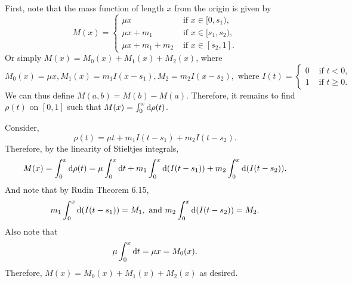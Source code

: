 \documentclass[12pt]{article}
\begin{document}
\begin{fproof}[3]
  First, note that the mass function of length \(x\) from the origin is given by
\[
    M(x) = \begin{cases}
        \mu x & \text{ if } x \in [0, s_1),\\
        \mu x + m_1 & \text{ if } x \in [s_1, s_2),\\
        \mu x + m_1 + m_2 & \text{ if } x \in [s_2, 1].
    \end{cases}
\]
Or simply \(M(x) = M_0(x) + M_1(x) + M_2(x)\), where
\[
    M_0(x) = \mu x, M_1(x) = m_1I(x-s_1), M_2 = m_2I(x-s_2), \text{ where } I(t) = 
    \begin{cases}
        0 & \text{ if } t < 0,\\
        1 & \text{ if } t \geq 0.
    \end{cases}
\]
  We can thus define \(M(a,b) = M(b) - M(a)\).
  Therefore, it remains to find \(\rho(t)\) on \([0,1]\) such that \(M(x) = \int_{0}^{x} \mathop{}\!\mathrm{d}\rho(t)\).

  Consider,
  \[
    \rho(t) = \mu t + m_1I(t-s_1) + m_2I(t-s_2).
  \]
  Therefore, by the linearity of Stieltjes integrals,
  \begin{align*}
    M(x) = \int_{0}^{x} \mathop{}\!\mathrm{d}\rho(t) = \mu \int_{0}^{x} \mathop{}\!\mathrm{d} t + m_1 \int_{0}^{x} \mathop{}\!\mathrm{d}(I(t-s_1)) + m_2 \int_{0}^{x} \mathop{}\!\mathrm{d}(I(t-s_2)).
  \end{align*}
  And note that by Rudin Theorem 6.15,
  \begin{align*}
    m_1 \int_{0}^{x} \mathop{}\!\mathrm{d}(I(t-s_1)) = M_1, \text{ and }  m_2 \int_{0}^{x} \mathop{}\!\mathrm{d}(I(t-s_2)) = M_2.
  \end{align*}
  Also note that
  \begin{align*}
    \mu \int_{0}^{x} \mathop{}\!\mathrm{d} t = \mu x = M_0(x).
  \end{align*}
  Therefore, \(M(x) = M_0(x) + M_1(x) + M_2(x)\) as desired.
\end{fproof}
\newpage
\end{document}
